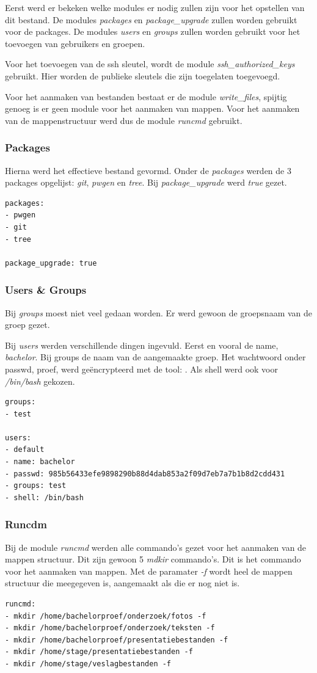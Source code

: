 Eerst werd er bekeken welke modules er nodig zullen zijn voor het opstellen van dit bestand. De modules \textit{packages} en \textit{package\_upgrade} zullen worden gebruikt voor de packages. De modules \textit{users} en \textit{groups} zullen worden gebruikt voor het toevoegen van gebruikers en groepen. 

Voor het toevoegen van de ssh sleutel, wordt de module \textit{ssh\_authorized\_keys} gebruikt. Hier worden de publieke sleutels die zijn toegelaten toegevoegd.

Voor het aanmaken van bestanden bestaat er de module \textit{write\_files}, spijtig genoeg is er geen module voor het aanmaken van mappen. Voor het aanmaken van de mappenstructuur werd dus de module \textit{runcmd} gebruikt.

\subsubsection{Packages}
Hierna werd het effectieve bestand gevormd. Onder de \textit{packages} werden de 3 packages opgelijst: \textit{git}, \textit{pwgen} en \textit{tree}. Bij \textit{package\_upgrade} werd \textit{true} gezet. 
\begin{lstlisting}[basicstyle=\small]
packages:
- pwgen
- git
- tree

package_upgrade: true
\end{lstlisting}

\subsubsection{Users \& Groups}
Bij \textit{groups} moest niet veel gedaan worden. Er werd gewoon de groepsnaam van de groep gezet.

Bij \textit{users} werden verschillende dingen ingevuld. Eerst en vooral de name, \textit{bachelor}. Bij groups de naam van de aangemaakte groep. Het wachtwoord onder passwd, proef, werd geëncrypteerd met de tool: \autocite{toolmkpass}. Als shell werd ook voor \textit{/bin/bash} gekozen.
\begin{lstlisting}[basicstyle=\small]
groups:
- test

users:
- default
- name: bachelor
- passwd: 985b56433efe9898290b88d4dab853a2f09d7eb7a7b1b8d2cdd431
- groups: test
- shell: /bin/bash
\end{lstlisting}


\subsubsection{Runcdm}
Bij de module \textit{runcmd} werden alle commando's gezet voor het aanmaken van de mappen structuur. Dit zijn gewoon 5 \textit{mdkir} commando's. Dit is het commando voor het aanmaken van mappen. Met de paramater \textit{-f} wordt heel de mappen structuur die meegegeven is, aangemaakt als die er nog niet is.
\begin{lstlisting}[basicstyle=\small]
runcmd:
- mkdir /home/bachelorproef/onderzoek/fotos -f
- mkdir /home/bachelorproef/onderzoek/teksten -f
- mkdir /home/bachelorproef/presentatiebestanden -f
- mkdir /home/stage/presentatiebestanden -f
- mkdir /home/stage/veslagbestanden -f
\end{lstlisting}

